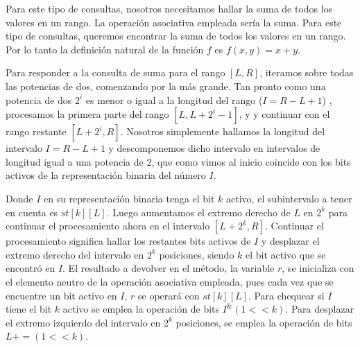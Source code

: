 Para este tipo de consultas, nosotros necesitamos hallar la suma de todos los valores en un rango. La operación asociativa empleada sería la suma. Para este tipo de consultas, queremos encontrar la suma de todos los valores en un rango. Por lo tanto la definición natural de la función $f$ es $f(x, y) = x + y$.

Para responder a la consulta de suma para el rango $[L, R]$, iteramos sobre todas las potencias de dos, comenzando por la más grande. Tan pronto
como una potencia de dos $2^i$ es menor o igual a la longitud del rango ($I= R - L + 1$) , procesamos la primera parte del rango $[L, L + 2^i - 1]$, y y
continuar con el rango restante $[L + 2^i, R]$. Nosotros simplemente hallamos la longitud del intervalo $I= R - L + 1$ y descomponemos dicho intervalo en intervalos de longitud igual a una potencia de 2, que como vimos al inicio coincide con los bits activos de la representación binaria del número $I$. 

Donde $I$ en su representación binaria tenga el bit $k$ activo, el subintervalo a tener en cuenta es $st[k][L]$. Luego aumentamos  el  extremo  derecho de  $L$  en   $2^k$  para continuar el procesamiento ahora en el intervalo $[L + 2^k, R]$. Continuar el procesamiento significa hallar los restantes bits activos de $I$ y desplazar el extremo derecho del intervalo en $2^k$ posiciones, siendo $k$ el bit activo que se encontró en $I$. El resultado a devolver en el método, la variable $r$, se inicializa con el elemento neutro de la operación asociativa empleada, pues cada vez que se encuentre un bit activo en $I$, $r$ se operará con $st[k][L]$. 
Para chequear si $I$ tiene el bit $k$ activo se emplea la operación de bits $I^ \& (1<<k)$. Para desplazar el extremo izquierdo del intervalo en $2^k$ posiciones, se emplea la operación de bits $L += (1<<k)$.

